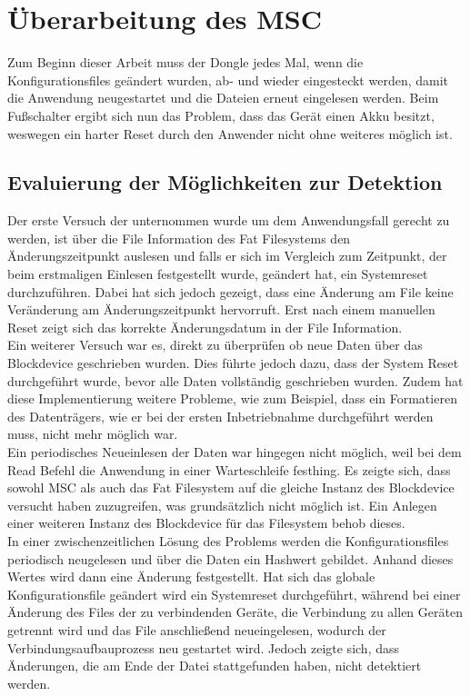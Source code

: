 \section{Überarbeitung des MSC}
Zum Beginn dieser Arbeit muss der Dongle jedes Mal, wenn die Konfigurationsfiles geändert wurden, ab- und wieder eingesteckt werden, damit die Anwendung neugestartet und die Dateien erneut eingelesen werden. Beim Fußschalter ergibt sich nun das Problem, dass das Gerät einen Akku besitzt, weswegen ein harter Reset durch den Anwender nicht ohne weiteres möglich ist.

\subsection{Evaluierung der Möglichkeiten zur Detektion}
Der erste Versuch der unternommen wurde um dem Anwendungsfall gerecht zu werden, ist über die File Information des Fat Filesystems den Änderungszeitpunkt auslesen und falls er sich im Vergleich zum Zeitpunkt, der beim erstmaligen Einlesen festgestellt wurde, geändert hat, ein Systemreset durchzuführen. Dabei hat sich jedoch gezeigt, dass eine Änderung am File keine Veränderung am Änderungszeitpunkt hervorruft. Erst nach einem manuellen Reset zeigt sich das korrekte Änderungsdatum in der File Information. \\
Ein weiterer Versuch war es, direkt zu überprüfen ob neue Daten über das Blockdevice geschrieben wurden. Dies führte jedoch dazu, dass der System Reset durchgeführt wurde, bevor alle Daten vollständig geschrieben wurden. Zudem hat diese Implementierung weitere Probleme, wie zum Beispiel, dass ein Formatieren des Datenträgers, wie er bei der ersten Inbetriebnahme durchgeführt werden muss, nicht mehr möglich war. \\
Ein periodisches Neueinlesen der Daten war hingegen nicht möglich, weil bei dem Read Befehl die Anwendung in einer Warteschleife festhing. Es zeigte sich, dass sowohl MSC als auch das Fat Filesystem auf die gleiche Instanz des Blockdevice versucht haben zuzugreifen, was grundsätzlich nicht möglich ist. Ein Anlegen einer weiteren Instanz des Blockdevice für das Filesystem behob dieses. \\
In einer zwischenzeitlichen Lösung des Problems werden die Konfigurationsfiles periodisch neugelesen und über die Daten ein Hashwert gebildet. Anhand dieses Wertes wird dann eine Änderung festgestellt. Hat sich das globale Konfigurationsfile geändert wird ein Systemreset durchgeführt, während bei einer Änderung des Files der zu verbindenden Geräte, die Verbindung zu allen Geräten getrennt wird und das File anschließend neueingelesen, wodurch der Verbindungsaufbauprozess neu gestartet wird. Jedoch zeigte sich, dass Änderungen, die am Ende der Datei stattgefunden haben, nicht detektiert werden.

